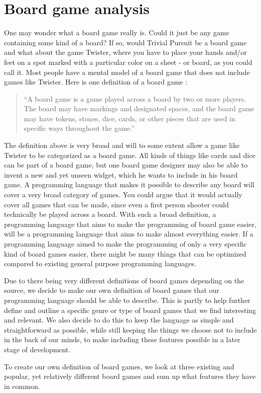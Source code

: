 \section{Board game analysis}
\label{sec:board-game-analysis}

One may wonder what a board game really is. Could it just be any game
containing some kind of a board? If so, would Trivial Pursuit be a board
game and what about the game Twister, where you have to place your hands
and/or feet on a spot marked with a particular color on a sheet - or
board, as you could call it. Most people have a mental model of a board
game that does not include games like Twister. Here is one definition of
a board game \cite{def-board-game}:

\begin{quote}
  ``A board game is a game played across a board by two or
  more players. The board may have markings and designated spaces, and the
  board game may have tokens, stones, dice, cards, or other pieces that
  are used in specific ways throughout the game.''
\end{quote}

The definition above is very broad and will to some extent allow a game
like Twister to be categorized as a board game. All kinds of things
like cards and dice can be part of a board game, but one board game
designer may also be able to invent a new and yet unseen widget, which
he wants to include in his board game. A programming language that makes
it possible to describe any board will cover a very broad category of
games. You could argue that it would actually cover all games that can
be made, since even a first person shooter could technically be played across a
board. With such a broad definition, a programming language that aims
to make the programming of board game easier, will be a programming
language that aims to make almost everything easier. If a programming
language aimed to make the programming of only a very specific kind of
board games easier, there might be many things that can be optimized
compared to existing general purpose programming languages.

Due to there being very different definitions of board games depending
on the source, we decide to make our own definition of board games that
our programming language should be able to describe. This is partly to
help further define and outline a specific genre or type of board games
that we find interesting and relevant. We also decide to do this to keep
the language as simple and straightforward as possible, while still
keeping the things we choose not to include in the back of our minds, to
make including these features possible in a later stage of development.

To create our own definition of board games, we look at three existing and popular, yet relatively different board games and sum up what features they have in common.
